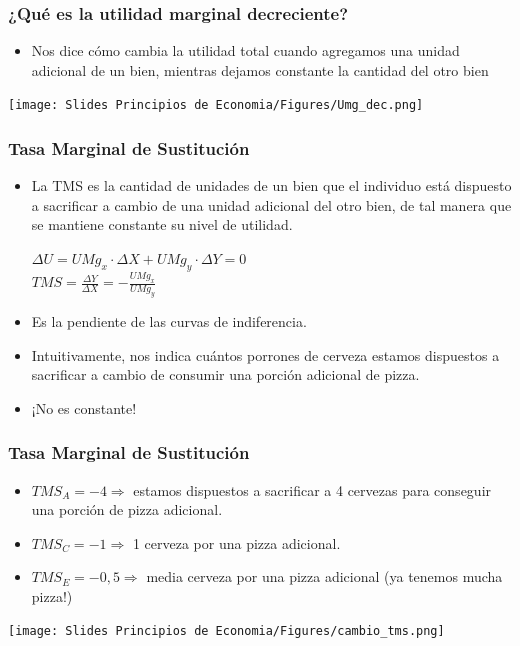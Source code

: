 \documentclass{beamer}
\begin{document}
\begin{frame}
\frametitle{¿Qué es la utilidad marginal decreciente?}
\begin{itemize}
    \item Nos dice cómo cambia la utilidad total cuando agregamos una unidad adicional de un bien, mientras dejamos constante la cantidad del otro bien 
    \end{itemize}    
    \vspace{0.4cm}
\begin{center}
    \texttt{[image: Slides Principios de Economia/Figures/Umg\_dec.png]}
    \end{center}
\end{frame}

\begin{frame}
\frametitle{Tasa Marginal de Sustitución}

\begin{itemize}
    \item La TMS es la cantidad de unidades de un bien que el individuo está dispuesto a sacrificar a cambio de una unidad adicional del otro bien, de tal manera que se mantiene constante su nivel de utilidad. \vspace{2mm}
    \begin{center}
        $\Delta U = UMg_x \cdot \Delta X + UMg_y \cdot \Delta Y = 0$ \\ \vspace{3mm}
        $TMS = \frac{\Delta Y}{\Delta X} = - \frac{UMg_x}{UMg_y}$ \vspace{2mm}
    \end{center}   
    \item Es la pendiente de las curvas de indiferencia.
    \item Intuitivamente, nos indica cuántos porrones de cerveza estamos dispuestos a sacrificar a cambio de consumir una porción adicional de pizza.
    \item  ¡No es constante!
\end{itemize} 
\end{frame}

\begin{frame}
\frametitle{Tasa Marginal de Sustitución}
\vspace{2mm}
\begin{itemize}
    \item  $TMS_A = -4 \Rightarrow$ estamos dispuestos a sacrificar a 4 cervezas para conseguir una porción de pizza adicional.
    \item  $TMS_C = -1 \Rightarrow$ 1 cerveza por una pizza adicional.
    \item  $TMS_E = -0,5 \Rightarrow$ media cerveza por una pizza adicional (ya tenemos mucha pizza!)
\end{itemize} 
\begin{center}
    \texttt{[image: Slides Principios de Economia/Figures/cambio\_tms.png]}
    \end{center}
\end{frame}
\end{document}
